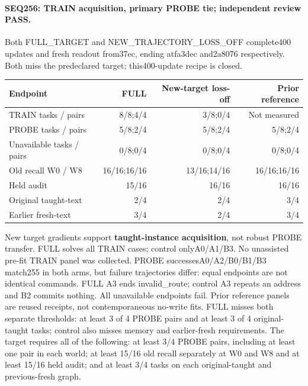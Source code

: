 \documentclass{article}
\begin{document}
\paragraph{SEQ256: TRAIN acquisition, primary PROBE tie; independent review PASS.}
Both FULL\_TARGET and NEW\_TRAJECTORY\_LOSS\_OFF complete400 updates and fresh
readout from37ec, ending atfa3dec and2a8076 respectively. Both miss the
predeclared target; this400-update recipe is closed.
\begin{center}
\small
\begin{tabular}{lrrr}
\toprule
Endpoint & FULL & New-target loss-off & Prior reference \\
\midrule
TRAIN tasks / pairs & 8/8;4/4 & 3/8;0/4 & Not measured \\
PROBE tasks / pairs & 5/8;2/4 & 5/8;2/4 & 5/8;2/4 \\
Unavailable tasks / pairs & 0/8;0/4 & 0/8;0/4 & 0/8;0/4 \\
Old recall W0 / W8 & 16/16;16/16 & 13/16;14/16 & 16/16;16/16 \\
Held audit & 15/16 & 16/16 & 16/16 \\
Original taught-text & 2/4 & 2/4 & 3/4 \\
Earlier fresh-text & 3/4 & 2/4 & 3/4 \\
\bottomrule
\end{tabular}
\end{center}
New target gradients support \textbf{taught-instance acquisition}, not robust
PROBE transfer. FULL solves all TRAIN cases; control onlyA0/A1/B3. No unassisted
pre-fit TRAIN panel was collected. PROBE successesA0/A2/B0/B1/B3 match255 in
both arms, but failure trajectories differ: equal endpoints are not identical
commands. FULL A3 ends invalid\_route; control A3 repeats an address and B2
commits nothing. All unavailable endpoints fail. Prior reference panels are
reused receipts, not contemporaneous no-write fits. FULL misses both separate
thresholds: at least 3 of 4 PROBE pairs and at least 3 of 4 original-taught tasks;
control also misses memory and earlier-fresh requirements.
The target requires all of the following: at least 3/4 PROBE pairs, including
at least one pair in each world; at least 15/16 old recall separately at W0
and W8 and at least 15/16 held audit; and at least 3/4 tasks on each
original-taught and previous-fresh graph.
\end{document}
